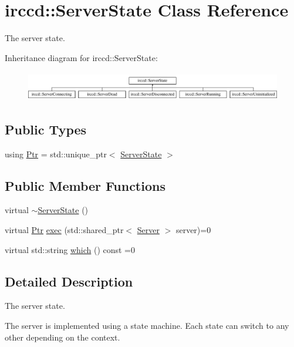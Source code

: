 \hypertarget{a00060}{\section{irccd\-:\-:Server\-State Class Reference}
\label{a00060}
}


The server state.  


Inheritance diagram for irccd\-:\-:Server\-State\-:\begin{figure}[H]
\begin{center}
\leavevmode
\includegraphics[height=1.309942cm]{a00060}
\end{center}
\end{figure}
\subsection*{Public Types}
\begin{DoxyCompactItemize}
\item 
using \hyperlink{a00060_aa1d1595a1abc377d310f06145103d7d3}{Ptr} = std\-::unique\-\_\-ptr$<$ \hyperlink{a00060}{Server\-State} $>$
\end{DoxyCompactItemize}
\subsection*{Public Member Functions}
\begin{DoxyCompactItemize}
\item 
virtual \hyperlink{a00060_a6e4c291189dd834910d1c0a2bd67ca5b}{$\sim$\-Server\-State} ()
\item 
virtual \hyperlink{a00060_aa1d1595a1abc377d310f06145103d7d3}{Ptr} \hyperlink{a00060_a614932562bafb898b057bb4c0576d96c}{exec} (std\-::shared\-\_\-ptr$<$ \hyperlink{a00055}{Server} $>$ server)=0
\item 
virtual std\-::string \hyperlink{a00060_af0912101bf33a1097470fae68b6d1c74}{which} () const =0
\end{DoxyCompactItemize}


\subsection{Detailed Description}
The server state. 

The server is implemented using a state machine. Each state can switch to any other depending on the context. 

